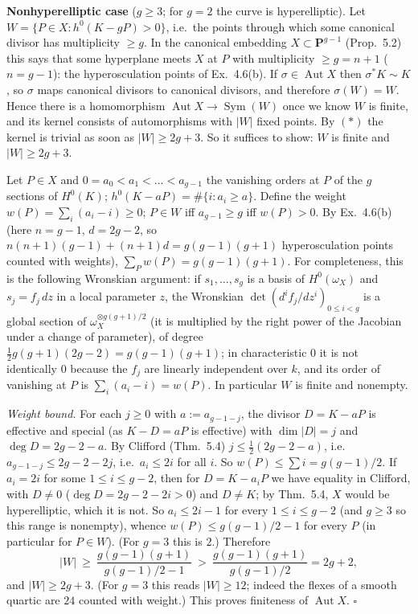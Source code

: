 \documentclass[11pt]{article}
\begin{document}
\textbf{Nonhyperelliptic case} ($g\ge3$; for $g=2$ the curve is hyperelliptic). Let $W=\{P\in X: h^0(K-gP)>0\}$, i.e.\ the points through which some canonical divisor has multiplicity $\ge g$. In the canonical embedding $X\subset\mathbf P^{g-1}$ (Prop.~5.2) this says that some hyperplane meets $X$ at $P$ with multiplicity $\ge g=n+1$ ($n=g-1$): the hyperosculation points of Ex.~4.6(b). If $\sigma\in\operatorname{Aut}X$ then $\sigma^*K\sim K$, so $\sigma$ maps canonical divisors to canonical divisors, and therefore $\sigma(W)=W$. Hence there is a homomorphism $\operatorname{Aut}X\to\operatorname{Sym}(W)$ once we know $W$ is finite, and its kernel consists of automorphisms with $|W|$ fixed points. By $(\ast)$ the kernel is trivial as soon as $|W|\ge2g+3$. So it suffices to show: $W$ is finite and $|W|\ge2g+3$.

Let $P\in X$ and $0=a_0<a_1<\dots<a_{g-1}$ the vanishing orders at $P$ of the $g$ sections of $H^0(K)$; $h^0(K-aP)=\#\{i:a_i\ge a\}$. Define the weight $w(P)=\sum_i(a_i-i)\ge0$; $P\in W$ iff $a_{g-1}\ge g$ iff $w(P)>0$. By Ex.~4.6(b) (here $n=g-1$, $d=2g-2$, so $n(n+1)(g-1)+(n+1)d=g(g-1)(g+1)$ hyperosculation points counted with weights), $\sum_Pw(P)=g(g-1)(g+1)$. For completeness, this is the following Wronskian argument: if $s_1,\dots,s_g$ is a basis of $H^0(\omega_X)$ and $s_j=f_j\,dz$ in a local parameter $z$, the Wronskian $\det(d^if_j/dz^i)_{0\le i<g}$ is a global section of $\omega_X^{\otimes g(g+1)/2}$ (it is multiplied by the right power of the Jacobian under a change of parameter), of degree $\frac12g(g+1)(2g-2)=g(g-1)(g+1)$; in characteristic $0$ it is not identically $0$ because the $f_j$ are linearly independent over $k$, and its order of vanishing at $P$ is $\sum_i(a_i-i)=w(P)$. In particular $W$ is finite and nonempty.

\emph{Weight bound.} For each $j\ge0$ with $a:=a_{g-1-j}$, the divisor $D=K-aP$ is effective and special (as $K-D=aP$ is effective) with $\dim|D|=j$ and $\deg D=2g-2-a$. By Clifford (Thm.~5.4) $j\le\frac12(2g-2-a)$, i.e.\ $a_{g-1-j}\le2g-2-2j$, i.e.\ $a_i\le2i$ for all $i$. So $w(P)\le\sum i=g(g-1)/2$. If $a_i=2i$ for some $1\le i\le g-2$, then for $D=K-a_iP$ we have equality in Clifford, with $D\ne0$ ($\deg D=2g-2-2i>0$) and $D\ne K$; by Thm.~5.4, $X$ would be hyperelliptic, which it is not. So $a_i\le2i-1$ for every $1\le i\le g-2$ (and $g\ge3$ so this range is nonempty), whence $w(P)\le g(g-1)/2-1$ for every $P$ (in particular for $P\in W$). (For $g=3$ this is $2$.) Therefore
\[
|W|\ \ge\ \frac{g(g-1)(g+1)}{g(g-1)/2-1}\ >\ \frac{g(g-1)(g+1)}{g(g-1)/2}=2g+2,
\]
and $|W|\ge2g+3$. (For $g=3$ this reads $|W|\ge12$; indeed the flexes of a smooth quartic are $24$ counted with weight.) This proves finiteness of $\operatorname{Aut}X$. \hfill$\square$
\end{document}
